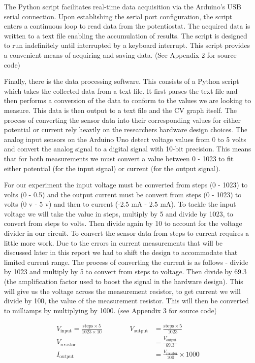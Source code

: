 \documentclass{article}
\begin{document}
The Python script facilitates real-time data acquisition via the Arduino's USB serial connection. Upon establishing the serial port configuration, the script enters a continuous loop to read data from the potentiostat. The acquired data is written to a text file enabling the accumulation of results. The script is designed to run indefinitely until interrupted by a keyboard interrupt. This script provides a convenient means of acquiring and saving data. (See Appendix 2 for source code)


Finally, there is the data processing software. This consists of a Python script which takes the collected data from a text file. It first parses the text file and then performs a conversion of the data to conform to the values we are looking to measure. This data is then output to a text file and the CV graph itself. The process of converting the sensor data into their corresponding values for either potential or current rely heavily on the researchers hardware design choices. The analog input sensors on the Arduino Uno detect voltage values from 0 to 5 volts and convert the analog signal to a digital signal with 10-bit precision. This means that for both measurements we must convert a value between 0 - 1023 to fit either potential (for the input signal) or current (for the output signal).


For our experiment the input voltage must be converted from steps (0 - 1023) to volts (0 - 0.5) and the output current must be convert from steps (0 - 1023) to volts (0 v - 5 v) and then to current (-2.5 mA - 2.5 mA). To tackle the input voltage we will take the value in steps, multiply by 5 and divide by 1023, to convert from steps to volts. Then divide again by 10 to account for the voltage divider in our circuit. To convert the sensor data from steps to current requires a little more work. Due to the errors in current measurements that will be discussed later in this report we had to shift the design to accommodate that limited current range. The process of converting the current is as follows - divide by 1023 and multiply by 5 to convert from steps to voltage. Then divide by 69.3 (the amplification factor used to boost the signal in the hardware design). This will give us the voltage across the measurement resistor, to get current we will divide by 100, the value of the measurement resistor. This will then be converted to milliamps by multiplying by 1000. (see Appendix 3 for source code)


\begin{align*}
  V_{\text{{input}}} = \frac{{\text{{steps}} \times 5}}{{1023 \times 10}} \qquad \qquad 
  V_{\text{{output}}} & = \frac{{\text{{steps}} \times 5}}{{1023}} \\
  V_{\text{{resistor}}} & = \frac{{V_{\text{{output}}}}}{{69.3}} \\
  I_{\text{{output}}} & = \frac{{V_{\text{{resistor}}}}}{{100}} \times 1000
\end{align*}
\end{document}
